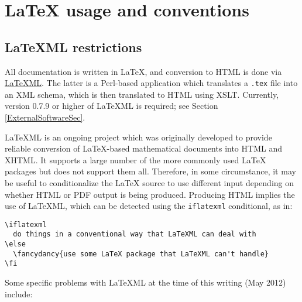 \documentclass{article}
\begin{document}
\section{LaTeX usage and conventions}

\label{LatexUsage}

\subsection{LaTeXML restrictions}

All documentation is written in LaTeX, and conversion to HTML is done
via \href{http://dlmf.nist.gov/LaTeXML/}{LaTeXML}.  The latter is a
Perl-based application which translates a {\tt .tex} file into an XML
schema, which is then translated to HTML using XSLT. Currently,
version 0.7.9 or higher of LaTeXML is required; see 
Section \ref{ExternalSoftwareSec}.

LaTeXML is an ongoing project which was originally developed to
provide reliable conversion of LaTeX-based mathematical documents into
HTML and XHTML. It supports a large number of the more commonly used
LaTeX packages but does not support them all. Therefore, in some
circumstance, it may be useful to conditionalize the LaTeX source to
use different input depending on whether HTML or PDF output is being
produced. Producing HTML implies the use of LaTeXML, which can be
detected using the {\tt \BKS iflatexml} conditional, as in:

\begin{lstlisting}[]
\iflatexml
  do things in a conventional way that LaTeXML can deal with
\else
  \fancydancy{use some LaTeX package that LaTeXML can't handle}
\fi
\end{lstlisting}

Some specific problems with LaTeXML at the time of this writing
(May 2012) include:
\end{document}
